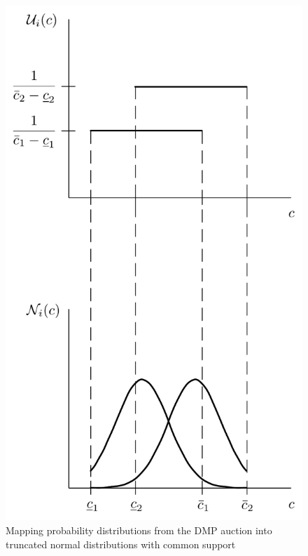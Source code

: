 \begin{figure}[p!]
  \includegraphics[width=\figsize]{Approximation/Figures/dmp_to_common_priors}
  \caption{Mapping probability distributions from the DMP auction into truncated normal distributions with common support}
  \label{fig:dmp_to_common_priors_approximation}
\end{figure}

